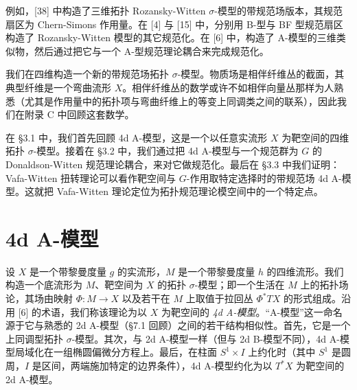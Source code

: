 
例如，[38] 中构造了三维拓扑 Rozansky-Witten $\sigma$-模型的带规范场版本，其规范扇区为 Chern-Simons 作用量。在 [4] 与 [15] 中，分别用 B-型与 BF 型规范扇区构造了 Rozansky-Witten 模型的其它规范化。在 [6] 中，构造了 A-模型的三维类似物，然后通过把它与一个 A-型规范理论耦合来完成规范化。

我们在四维构造一个新的带规范场拓扑 $\sigma$-模型。物质场是相伴纤维丛的截面，其典型纤维是一个弯曲流形 $X$。相伴纤维丛的数学或许不如相伴向量丛那样为人熟悉（尤其是作用量中的拓扑项与弯曲纤维上的等变上同调类之间的联系），因此我们在附录 C 中回顾这套数学。


在 §3.1 中，我们首先回顾 4d A-模型，这是一个以任意实流形 $X$ 为靶空间的四维拓扑 $\sigma$-模型。接着在 §3.2 中，我们通过把 4d A-模型与一个规范群为 $G$ 的 Donaldson-Witten 规范理论耦合，来对它做规范化。最后在 §3.3 中我们证明：Vafa-Witten 扭转理论可以看作靶空间与 $G$-作用取特定选择时的带规范场 4d A-模型。这就把 Vafa-Witten 理论定位为拓扑规范理论模空间中的一个特定点。

\section{4d A-模型}

设 $X$ 是一个带黎曼度量 $g$ 的实流形，$M$ 是一个带黎曼度量 $h$ 的四维流形。我们构造一个底流形为 $M$、靶空间为 $X$ 的拓扑 $\sigma$-模型；即一个生活在 $M$ 上的拓扑场论，其场由映射 $\Phi:M\to X$ 以及若干在 $M$ 上取值于拉回丛 $\Phi^*TX$ 的形式组成。沿用 [6] 的术语，我们称该理论为以 $X$ 为靶空间的 \emph{4d A-模型}。“A-模型”这一命名源于它与熟悉的 2d A-模型（§7.1 回顾）之间的若干结构相似性。首先，它是一个上同调型拓扑 $\sigma$-模型。其次，与 2d A-模型一样（但与 2d B-模型不同），4d A-模型局域化在一组椭圆偏微分方程上。最后，在柱面 $S^1\times I$ 上约化时（其中 $S^1$ 是圆周，$I$ 是区间，两端施加特定的边界条件），4d A-模型约化为以 $T^*X$ 为靶空间的 2d A-模型。

